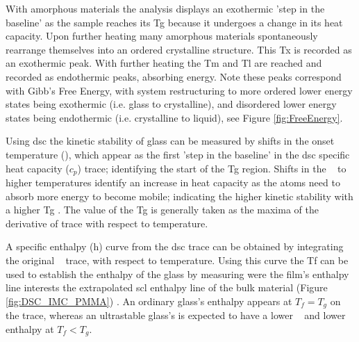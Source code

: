 \documentclass[a4paper,12pt,oneside]{report}%
\begin{document}
With amorphous materials the analysis displays an exothermic 'step in the baseline' as the sample reaches its \gls{Tg} because it undergoes a change in its heat capacity. Upon further heating many amorphous materials spontaneously rearrange themselves into an ordered crystalline structure. This \gls{Tx}  is recorded as an exothermic peak. With further heating the \gls{Tm} and \gls{Tl} are reached and recorded as endothermic peaks,  absorbing energy. Note these peaks correspond with Gibb's Free Energy,  with system restructuring to more ordered lower energy states being exothermic (i.e. glass to crystalline), and disordered lower energy states being endothermic (i.e. crystalline to liquid), see Figure \ref{fig:FreeEnergy}.

Using \gls{dsc} the kinetic stability of glass can be measured by shifts in the onset temperature (\Tonset), which appear as the first 'step in the baseline' in the \gls{dsc} specific heat capacity ($c_{p}$) trace; identifying the start of the \gls{Tg} region. Shifts in the \Tonset~ to higher temperatures identify an increase in heat capacity as the atoms need to absorb more energy to become mobile; indicating the higher kinetic stability with a higher \gls{Tg} \cite{Kearns2008}. The value of the \gls{Tg} is generally taken as the maxima of the derivative of trace with respect to temperature.

A specific enthalpy (h) curve from the \gls{dsc} trace can be obtained by integrating the original \Cp~ trace, with respect to temperature. Using this curve the \gls{Tf}  can be used to establish the enthalpy of the glass  by measuring were the film's enthalpy line interests the extrapolated \gls{scl} enthalpy line of the bulk material (Figure \ref{fig:DSC_IMC_PMMA}) \cite{Kearns2008}. An ordinary glass's enthalpy appears at $T_{f} = T_{g}$ on the trace, whereas an ultrastable glass's is expected to have a lower \Tf~ and lower enthalpy at $T_{f} < T_{g}$. 
\end{document}
